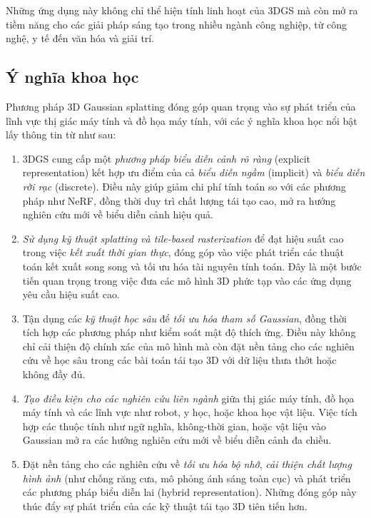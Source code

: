     Những ứng dụng này không chỉ thể hiện tính linh hoạt của 3DGS mà còn mở ra tiềm năng cho các giải pháp sáng tạo trong nhiều ngành công nghiệp, từ công nghệ, y tế đến văn hóa và giải trí.
    
    \subsection{Ý nghĩa khoa học} Phương pháp 3D Gaussian splatting đóng góp quan trọng vào sự phát triển của lĩnh vực thị giác máy tính và đồ họa máy tính, với các ý nghĩa khoa học nổi bật lấy thông tin từ \cite{b2} như sau:
    \begin{enumerate}
        \item 3DGS cung cấp một \textit{phương pháp biểu diễn cảnh rõ ràng} (explicit representation) kết hợp ưu điểm của cả \textit{biểu diễn ngầm} (implicit) và \textit{biểu diễn rời rạc} (discrete). Điều này giúp giảm chi phí tính toán so với các phương pháp như NeRF, đồng thời duy trì chất lượng tái tạo cao, mở ra hướng nghiên cứu mới về biểu diễn cảnh hiệu quả. 
        
        \item \textit{Sử dụng kỹ thuật splatting và tile-based rasterization} để đạt hiệu suất cao trong việc \textit{kết xuất thời gian thực}, đóng góp vào việc phát triển các thuật toán kết xuất song song và tối ưu hóa tài nguyên tính toán. Đây là một bước tiến quan trọng trong việc đưa các mô hình 3D phức tạp vào các ứng dụng yêu cầu hiệu suất cao. 
        
        \item Tận dụng các \textit{kỹ thuật học sâu} để \textit{tối ưu hóa tham số Gaussian}, đồng thời tích hợp các phương pháp như kiểm soát mật độ thích ứng. Điều này không chỉ cải thiện độ chính xác của mô hình mà còn đặt nền tảng cho các nghiên cứu về học sâu trong các bài toán tái tạo 3D với dữ liệu thưa thớt hoặc không đầy đủ. 
        
        \item \textit{Tạo điều kiện cho các nghiên cứu liên ngành} giữa thị giác máy tính, đồ họa máy tính và các lĩnh vực như robot, y học, hoặc khoa học vật liệu. Việc tích hợp các thuộc tính như ngữ nghĩa, không-thời gian, hoặc vật liệu vào Gaussian mở ra các hướng nghiên cứu mới về biểu diễn cảnh đa chiều. 
        
        \item Đặt nền tảng cho các nghiên cứu về \textit{tối ưu hóa bộ nhớ}, \textit{cải thiện chất lượng hình ảnh} (như chống răng cưa, mô phỏng ánh sáng toàn cục) và phát triển các phương pháp biểu diễn lai (hybrid representation). Những đóng góp này thúc đẩy sự phát triển của các kỹ thuật tái tạo 3D tiên tiến hơn.
    \end{enumerate}

